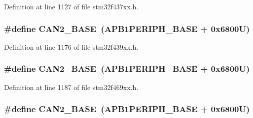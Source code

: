 Definition at line 1127 of file stm32f437xx.\+h.

\subsubsection[{\texorpdfstring{C\+A\+N2\+\_\+\+B\+A\+SE}{CAN2_BASE}}]{\setlength{\rightskip}{0pt plus 5cm}\#define C\+A\+N2\+\_\+\+B\+A\+SE~({\bf A\+P\+B1\+P\+E\+R\+I\+P\+H\+\_\+\+B\+A\+SE} + 0x6800\+U)}\hypertarget{group___peripheral__memory__map_gaf7b8267b0d439f8f3e82f86be4b9fba1}{}\label{group___peripheral__memory__map_gaf7b8267b0d439f8f3e82f86be4b9fba1}


Definition at line 1176 of file stm32f439xx.\+h.

\subsubsection[{\texorpdfstring{C\+A\+N2\+\_\+\+B\+A\+SE}{CAN2_BASE}}]{\setlength{\rightskip}{0pt plus 5cm}\#define C\+A\+N2\+\_\+\+B\+A\+SE~({\bf A\+P\+B1\+P\+E\+R\+I\+P\+H\+\_\+\+B\+A\+SE} + 0x6800\+U)}\hypertarget{group___peripheral__memory__map_gaf7b8267b0d439f8f3e82f86be4b9fba1}{}\label{group___peripheral__memory__map_gaf7b8267b0d439f8f3e82f86be4b9fba1}


Definition at line 1187 of file stm32f469xx.\+h.

\subsubsection[{\texorpdfstring{C\+A\+N2\+\_\+\+B\+A\+SE}{CAN2_BASE}}]{\setlength{\rightskip}{0pt plus 5cm}\#define C\+A\+N2\+\_\+\+B\+A\+SE~({\bf A\+P\+B1\+P\+E\+R\+I\+P\+H\+\_\+\+B\+A\+SE} + 0x6800\+U)}\hypertarget{group___peripheral__memory__map_gaf7b8267b0d439f8f3e82f86be4b9fba1}{}\label{group___peripheral__memory__map_gaf7b8267b0d439f8f3e82f86be4b9fba1}


